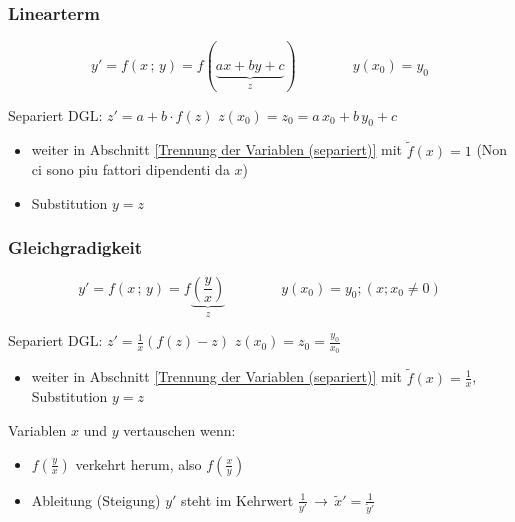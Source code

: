 \subsubsection{Linearterm}

\vspace{-0.2cm}

$$ y' = f(x \, ; \, y) = f( \underbrace{ax + by +c}_{\substack{z}}) \qquad \qquad y(x_0) = y_0 $$\vspace{-1em}

Separiert DGL: \quad $\boxed{z' = a + b \cdot f(z)}$ \qquad \qquad $z(x_0) = z_0 = a  \,x_0 + b \, y_0 + c$ 

\smallskip
\begin{itemize}
    \item weiter in Abschnitt \ref{Trennung der Variablen (separiert)} 
    mit $\tilde{f}(x) = 1$ (Non ci sono piu fattori dipendenti da $x$)
    \item Substitution $y = z$
\end{itemize}

\subsubsection{Gleichgradigkeit}\vspace{-0.2cm}

$$ y' = f(x \, ; \, y) = f \underbrace{\left(\frac{y}{x}\right)}_z \qquad \qquad y(x_0) = y_0 ; (x ; x_0 \neq 0) $$\vspace{-0.5em}

Separiert DGL: \quad $\boxed{z' = \frac{1}{x} (f(z) - z)}$ \qquad \qquad $z(x_0) = z_0 = \frac{y_0}{x_0}$ 

\begin{itemize}
    \item weiter in Abschnitt \ref{Trennung der Variablen (separiert)} mit $\tilde{f}(x) = \frac{1}{x}$, Substitution $y = z$ 
\end{itemize}

\medskip


Variablen $x$ und $y$ vertauschen wenn:

\smallskip

\begin{itemize}
    \item $f(\frac{y}{x})$ verkehrt herum, also $f(\frac{x}{y})$
    \item Ableitung (Steigung) $y'$ steht im Kehrwert $\frac{1}{y'} \, \longrightarrow \, \tilde{x}' = \frac{1}{\tilde{y}'}$
\end{itemize}


